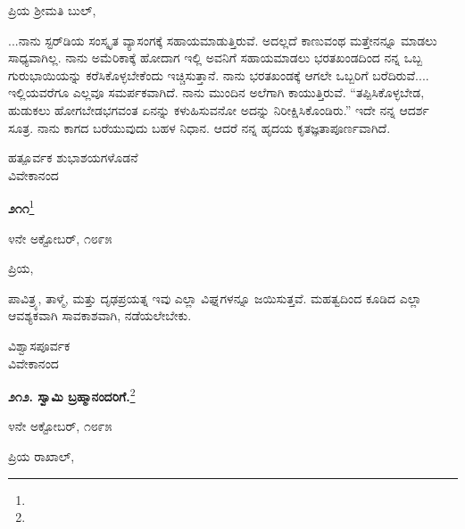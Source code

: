 \noindent
ಪ್ರಿಯ ಶ‍್ರೀಮತಿ ಬುಲ್,

...ನಾನು ಸ್ಟರ್‌ಡಿಯ ಸಂಸ್ಕೃತ ವ್ಯಾಸಂಗಕ್ಕೆ ಸಹಾಯಮಾಡುತ್ತಿರುವೆ. ಅದಲ್ಲದೆ ಕಾಣುವಂಥ ಮತ್ತೇನನ್ನೂ ಮಾಡಲು ಸಾಧ್ಯವಾಗಿಲ್ಲ. ನಾನು ಅಮೆರಿಕಾಕ್ಕೆ ಹೋದಾಗ ಇಲ್ಲಿ ಅವನಿಗೆ ಸಹಾಯಮಾಡಲು ಭರತಖಂಡದಿಂದ ನನ್ನ ಒಬ್ಬ ಗುರುಭಾಯಿಯನ್ನು ಕರೆಸಿಕೊಳ್ಳಬೇಕೆಂದು ಇಚ್ಚಿಸುತ್ತಾನೆ. ನಾನು ಭರತಖಂಡಕ್ಕೆ ಆಗಲೇ ಒಬ್ಬರಿಗೆ ಬರೆದಿರುವೆ.... ಇಲ್ಲಿಯವರೆಗೂ ಎಲ್ಲವೂ ಸಮರ್ಪಕವಾಗಿದೆ. ನಾನು ಮುಂದಿನ ಅಲೆಗಾಗಿ ಕಾಯುತ್ತಿರುವೆ. “ತಪ್ಪಿಸಿಕೊಳ್ಳಬೇಡ, ಹುಡುಕಲು ಹೋಗಬೇಡ\enginline{-}ಭಗವಂತ ಏನನ್ನು ಕಳುಹಿಸುವನೋ ಅದನ್ನು ನಿರೀಕ್ಷಿಸಿಕೊಂಡಿರು.” ಇದೇ ನನ್ನ ಆದರ್ಶ ಸೂತ್ರ. ನಾನು ಕಾಗದ ಬರೆಯುವುದು ಬಹಳ ನಿಧಾನ. ಆದರೆ ನನ್ನ ಹೃದಯ ಕೃತಜ್ಞತಾಪೂರ್ಣವಾಗಿದೆ.

\vspace{-0.4cm}

{\flushright
ಹತ್ಪೂರ್ವಕ ಶುಭಾಶಯಗಳೊಡನೆ\\ವಿವೇಕಾನಂದ\par}
\vspace{-0.5cm}

\begin{center}
\textbf{೨೧೧}\footnote{}
\end{center}

\vspace{-0.7cm}

\begin{flushright}
೪ನೇ ಅಕ್ಟೋಬರ್, ೧೮೯೫
\end{flushright}

\vspace{-0.4cm}

\noindent
ಪ್ರಿಯ,

ಪಾವಿತ್ರ್ಯ, ತಾಳ್ಮೆ, ಮತ್ತು ದೃಢಪ್ರಯತ್ನ\enginline{-} ಇವು ಎಲ್ಲಾ ವಿಘ್ನಗಳನ್ನೂ ಜಯಿಸುತ್ತವೆ. ಮಹತ್ವದಿಂದ ಕೂಡಿದ ಎಲ್ಲಾ ಆವಶ್ಯಕವಾಗಿ ಸಾವಕಾಶವಾಗಿ, ನಡೆಯಲೇಬೇಕು.

\vspace{-0.3cm}

{\flushright
ವಿಶ್ವಾಸಪೂರ್ವಕ\\ವಿವೇಕಾನಂದ\par}

\newpage

\begin{center}
\textbf{೨೧೨. ಸ್ವಾಮಿ ಬ್ರಹ್ಮಾನಂದರಿಗೆ.}\footnote{}
\end{center}

\vspace{-0.5cm}

\begin{flushright}
೪ನೇ ಅಕ್ಟೋಬರ್, ೧೮೯೫
\end{flushright}

\noindent
ಪ್ರಿಯ ರಾಖಾಲ್,

